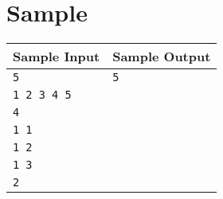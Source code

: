 \documentclass{article}
\begin{document}
\section*{Sample}

\begin{tabular}{l|l}
    \hline
    \hline
    Sample Input & Sample Output \\
    \hline
    \verb+5+ & \verb+5+ \\
    \verb+1 2 3 4 5+ & \verb++ \\
    \verb+4+ & \verb++ \\
    \verb+1 1+ & \verb++ \\
    \verb+1 2+ & \verb++ \\
    \verb+1 3+ & \verb++ \\
    \verb+2+ & \verb++ \\
    \hline
\end{tabular}
\end{document}
